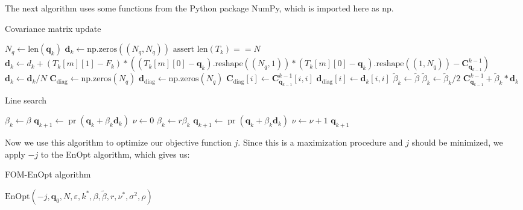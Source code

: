 The next algorithm uses some functions from the Python package NumPy, which is imported here as $\mathrm{np}$.
\begin{algorithm}[H]%
\caption{Covariance matrix update}
\begin{algorithmic}[1]
\State $N_q\gets \mathrm{len}(\mathbf{q}_k)$
\State $\mathbf{d}_k \gets \mathrm{np.zeros}((N_q, N_q))$
\State $\mathrm{assert}$ $\mathrm{len}(T_k) == N$
\State $\mathbf{d}_k \gets d_k + (T_k[m][1]-F_k)*((T_k[m][0]-\mathbf{q}_k).\mathrm{reshape}((N_q,1))*(T_k[m][0]-\mathbf{q}_k).\mathrm{reshape}((1,N_q))-\mathbf{C}_{\mathbf{q}_{k-1}}^{k-1})$
\EndFor
\State $\mathbf{d}_k \gets \mathbf{d}_k/N$
\State $\mathbf{C}_\mathrm{diag}\gets\mathrm{np.zeros}(N_q)$
\State $\mathbf{d}_\mathrm{diag}\gets\mathrm{np.zeros}(N_q)$
\State $\mathbf{C}_\mathrm{diag}[i]\gets\mathbf{C}_{\mathbf{q}_{k-1}}^{k-1}[i, i]$
\State $\mathbf{d}_\mathrm{diag}[i]\gets\mathbf{d}_k[i, i]$
\EndFor
\State $\tilde{\beta}_k\gets\tilde{\beta}$
\State $\tilde{\beta}_k \gets \tilde{\beta}_k/2$
\EndWhile
\State \Return $\mathbf{C}_{\mathbf{q}_{k-1}}^{k-1}+\tilde{\beta}_k*\mathbf{d}_k$
\EndProcedure
\end{algorithmic}
\end{algorithm}
\begin{algorithm}[H]%
\caption{Line search}
\begin{algorithmic}[1]
\State $\beta_k \gets \beta$
\State $\mathbf{q}_{k+1} \gets \operatorname{pr}(\mathbf{q}_k+\beta_k\mathbf{d}_k)$
\State $\nu \gets 0$
\State $\beta_k \gets r\beta_k$
\State $\mathbf{q}_{k+1} \gets \operatorname{pr}(\mathbf{q}_k+\beta_k\mathbf{d}_k)$
\State $\nu \gets \nu+1$
\EndWhile
\Return $\mathbf{q}_{k+1}$
\EndProcedure
\end{algorithmic}
\end{algorithm}
Now we use this algorithm to optimize our objective function $j$. Since this is a maximization procedure and $j$ should be minimized, we apply $-j$ to the EnOpt algorithm, which gives us:
\begin{algorithm}[H]%
\caption{FOM-EnOpt algorithm}
\begin{algorithmic}[1]
\State \Return $\mathrm{EnOpt}(-j,\mathbf{q}_0,N,\varepsilon,k^*,\beta,\tilde{\beta},r,\nu^*,\sigma^2,\rho)$
\EndProcedure
\end{algorithmic}
\end{algorithm}